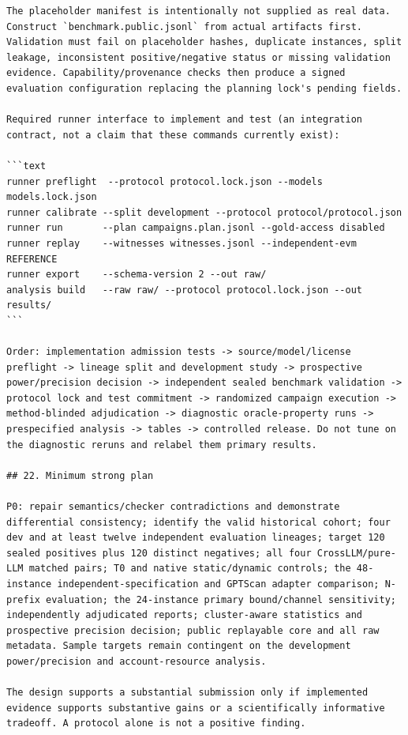 \documentclass[11pt,a4paper]{article}
\begin{document}
\begin{verbatim}
The placeholder manifest is intentionally not supplied as real data. Construct `benchmark.public.jsonl` from actual artifacts first. Validation must fail on placeholder hashes, duplicate instances, split leakage, inconsistent positive/negative status or missing validation evidence. Capability/provenance checks then produce a signed evaluation configuration replacing the planning lock's pending fields.

Required runner interface to implement and test (an integration contract, not a claim that these commands currently exist):

```text
runner preflight  --protocol protocol.lock.json --models models.lock.json
runner calibrate --split development --protocol protocol/protocol.json
runner run       --plan campaigns.plan.jsonl --gold-access disabled
runner replay    --witnesses witnesses.jsonl --independent-evm REFERENCE
runner export    --schema-version 2 --out raw/
analysis build   --raw raw/ --protocol protocol.lock.json --out results/
```

Order: implementation admission tests -> source/model/license preflight -> lineage split and development study -> prospective power/precision decision -> independent sealed benchmark validation -> protocol lock and test commitment -> randomized campaign execution -> method-blinded adjudication -> diagnostic oracle-property runs -> prespecified analysis -> tables -> controlled release. Do not tune on the diagnostic reruns and relabel them primary results.

## 22. Minimum strong plan

P0: repair semantics/checker contradictions and demonstrate differential consistency; identify the valid historical cohort; four dev and at least twelve independent evaluation lineages; target 120 sealed positives plus 120 distinct negatives; all four CrossLLM/pure-LLM matched pairs; T0 and native static/dynamic controls; the 48-instance independent-specification and GPTScan adapter comparison; N-prefix evaluation; the 24-instance primary bound/channel sensitivity; independently adjudicated reports; cluster-aware statistics and prospective precision decision; public replayable core and all raw metadata. Sample targets remain contingent on the development power/precision and account-resource analysis.

The design supports a substantial submission only if implemented evidence supports substantive gains or a scientifically informative tradeoff. A protocol alone is not a positive finding.


\end{verbatim}
\end{document}
